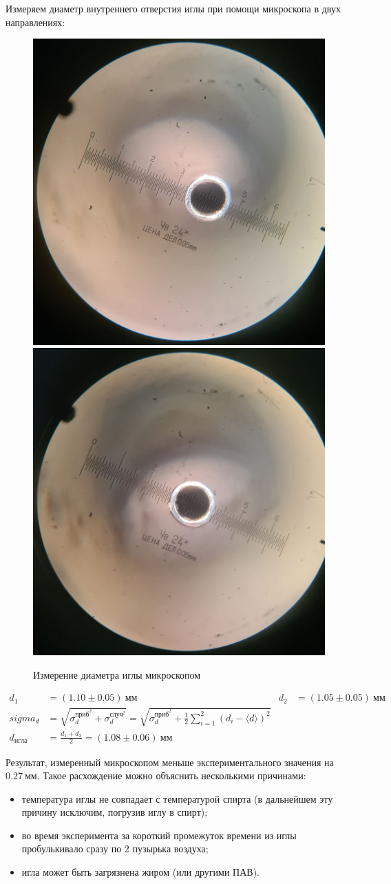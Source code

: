 \documentclass[a4paper, 12pt]{article}
\begin{document}
			Измеряем диаметр внутреннего отверстия иглы при помощи микроскопа в двух направлениях:

			\begin{figure}[ht!]
				\includegraphics[width=.49\textwidth]{img/microscope1}\hfill
				\includegraphics[width=.49\textwidth]{img/microscope2}
				\caption{Измерение диаметра иглы микроскопом}
			\end{figure}

			\begin{align*}
				d_1 &= (1.10 \pm 0.05)~мм & d_2 &= (1.05 \pm 0.05)~мм\\
				sigma_d &= \sqrt{\sigma_d^{приб^2} + \sigma_d^{случ^2}} = \sqrt{\sigma_d^{приб^2} + \frac{1}{2}\sum_{i=1}^2(d_i - \langle d \rangle)^2}\\
				d_{игла} &= \frac{d_1 + d_2}{2} = (1.08 \pm 0.06)~мм
			\end{align*}

			Результат, измеренный микроскопом меньше экспериментального значения на $0.27~мм$. Такое расхождение можно объяснить несколькими причинами:
			\begin{itemize}
				\item температура иглы не совпадает с температурой спирта (в дальнейшем эту причину исключим, погрузив иглу в спирт);
				\item во время эксперимента за короткий промежуток времени из иглы пробулькивало сразу по 2 пузырька воздуха;
				\item игла может быть загрязнена жиром (или другими ПАВ).
			\end{itemize}
\end{document}
